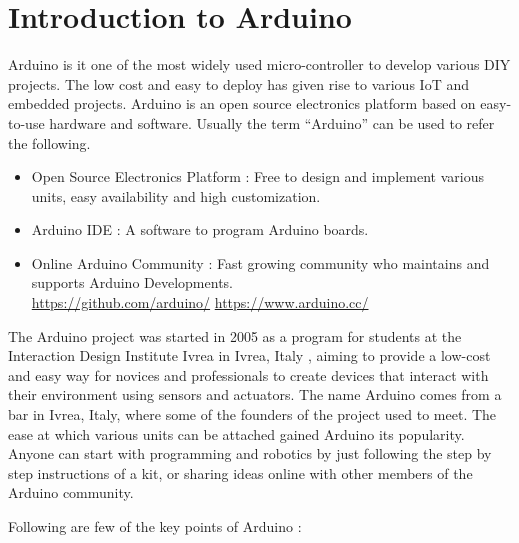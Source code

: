 \chapter{Introduction to Arduino}
\label{ch:arduino-uno}
\par Arduino is it one of the most widely used micro-controller to develop various DIY projects. The low cost and easy to deploy has given rise to various \ac{IoT} and embedded projects. Arduino is an open source electronics platform based on easy-to-use hardware and software. Usually the term “Arduino” can be used to refer the following.

\begin{itemize}
    \item Open Source Electronics Platform : Free to design and implement various units, easy availability and high customization. 
    \item Arduino \ac{IDE} : A software to program Arduino boards.
    \item Online Arduino Community : Fast growing community who maintains and supports Arduino Developments. \\
    \url{https://github.com/arduino/} \hspace{0.5cm} \url{https://www.arduino.cc/}

\end{itemize}

\par The Arduino project was started in 2005 as a program for students at the Interaction Design Institute Ivrea in Ivrea, Italy , aiming to provide a low-cost and easy way for novices and professionals to create devices that interact with their environment using sensors and actuators. The name Arduino comes from a bar in Ivrea, Italy, where some of the founders of the project used to meet. The ease at which various units can be attached gained Arduino its popularity. Anyone can start with programming and robotics by just following the step by step instructions of a kit, or sharing ideas online with other members of the Arduino community.

\par Following are few of the key points of Arduino :

